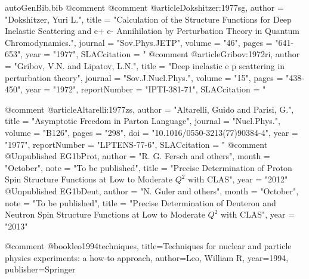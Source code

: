 \begin{filecontents*}{autoGenBib.bib}
@comment %
@comment %
@article{Dokshitzer:1977sg,
      author         = "Dokshitzer, Yuri L.",
      title          = "{Calculation of the Structure Functions for Deep
                        Inelastic Scattering and e+ e- Annihilation by
                        Perturbation Theory in Quantum Chromodynamics.}",
      journal        = "Sov.Phys.JETP",
      volume         = "46",
      pages          = "641-653",
      year           = "1977",
      SLACcitation   = "%
}
@comment %
@article{Gribov:1972ri,
      author         = "Gribov, V.N. and Lipatov, L.N.",
      title          = "{Deep inelastic e p scattering in perturbation theory}",
      journal        = "Sov.J.Nucl.Phys.",
      volume         = "15",
      pages          = "438-450",
      year           = "1972",
      reportNumber   = "IPTI-381-71",
      SLACcitation   = "%
}

@comment %
@article{Altarelli:1977zs,
      author         = "Altarelli, Guido and Parisi, G.",
      title          = "{Asymptotic Freedom in Parton Language}",
      journal        = "Nucl.Phys.",
      volume         = "B126",
      pages          = "298",
      doi            = "10.1016/0550-3213(77)90384-4",
      year           = "1977",
      reportNumber   = "LPTENS-77-6",
      SLACcitation   = "%
}
@comment %
@Unpublished{ EG1bProt,
	author = "R. G. Fersch and others",
	month = "October",
	note = "{To be published}",
	title = "{Precise Determination of Proton Spin Structure Functions at Low to Moderate $Q^2$ with CLAS}",
	year = "2012"
}
@Unpublished{ EG1bDeut,
	author = "N. Guler and others",
	month = "October",
	note = "{To be published}",
	title = "{Precise Determination of Deuteron and Neutron Spin Structure Functions at Low to Moderate $Q^2$ with CLAS}",
	year = "2013"
}

@comment %
@book{leo1994techniques,
  title={Techniques for nuclear and particle physics experiments: a how-to approach},
  author={Leo, William R},
  year={1994},
  publisher={Springer}
}


\end{filecontents*}
